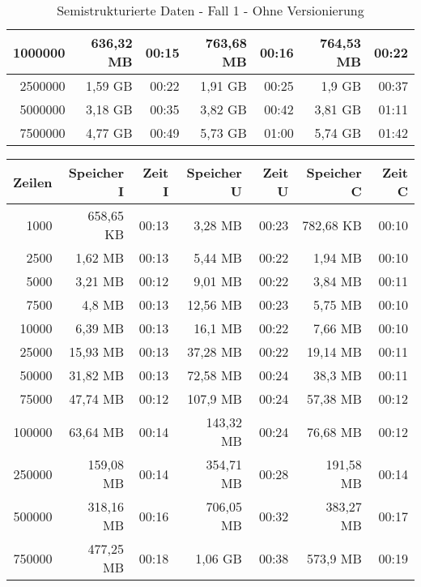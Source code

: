 \begin{table}[h!]
\begin{tabular}{|r|r|r|r|r|r|r|}
        1000000 & 636,32 MB & 00:15 & 763,68 MB & 00:16 & 764,53 MB & 00:22 \\ \hline
        2500000 & 1,59 GB   & 00:22 & 1,91 GB   & 00:25 & 1,9 GB    & 00:37 \\ \hline
        5000000 & 3,18 GB   & 00:35 & 3,82 GB   & 00:42 & 3,81 GB   & 01:11 \\ \hline
        7500000 & 4,77 GB   & 00:49 & 5,73 GB   & 01:00 & 5,74 GB   & 01:42 \\ \hline
    \end{tabular}
    \caption{Semistrukturierte Daten - Fall 1 - Ohne Versionierung}
    \label{tab:sql-80-20-40-cdc}
\end{table}

\begin{table}[h!]
    \centering
    \begin{tabular}{|r|r|r|r|r|r|r|}
        \hline
        \textbf{Zeilen} & \textbf{Speicher I} & \textbf{Zeit I} & \textbf{Speicher U} & \textbf{Zeit U} & \textbf{Speicher C} & \textbf{Zeit C} \\ \hline
        1000    & 658,65 KB & 00:13 & 3,28 MB   & 00:23 & 782,68 KB & 00:10 \\ \hline
        2500    & 1,62 MB   & 00:13 & 5,44 MB   & 00:22 & 1,94 MB   & 00:10 \\ \hline
        5000    & 3,21 MB   & 00:12 & 9,01 MB   & 00:22 & 3,84 MB   & 00:11 \\ \hline
        7500    & 4,8 MB    & 00:13 & 12,56 MB  & 00:23 & 5,75 MB   & 00:10 \\ \hline
        10000   & 6,39 MB   & 00:13 & 16,1 MB   & 00:22 & 7,66 MB   & 00:10 \\ \hline
        25000   & 15,93 MB  & 00:13 & 37,28 MB  & 00:22 & 19,14 MB  & 00:11 \\ \hline
        50000   & 31,82 MB  & 00:13 & 72,58 MB  & 00:24 & 38,3 MB   & 00:11 \\ \hline
        75000   & 47,74 MB  & 00:12 & 107,9 MB  & 00:24 & 57,38 MB  & 00:12 \\ \hline
        100000  & 63,64 MB  & 00:14 & 143,32 MB & 00:24 & 76,68 MB  & 00:12 \\ \hline
        250000  & 159,08 MB & 00:14 & 354,71 MB & 00:28 & 191,58 MB & 00:14 \\ \hline
        500000  & 318,16 MB & 00:16 & 706,05 MB & 00:32 & 383,27 MB & 00:17 \\ \hline
        750000  & 477,25 MB & 00:18 & 1,06 GB   & 00:38 & 573,9 MB  & 00:19 \\ \hline

\end{tabular}
\end{table}

